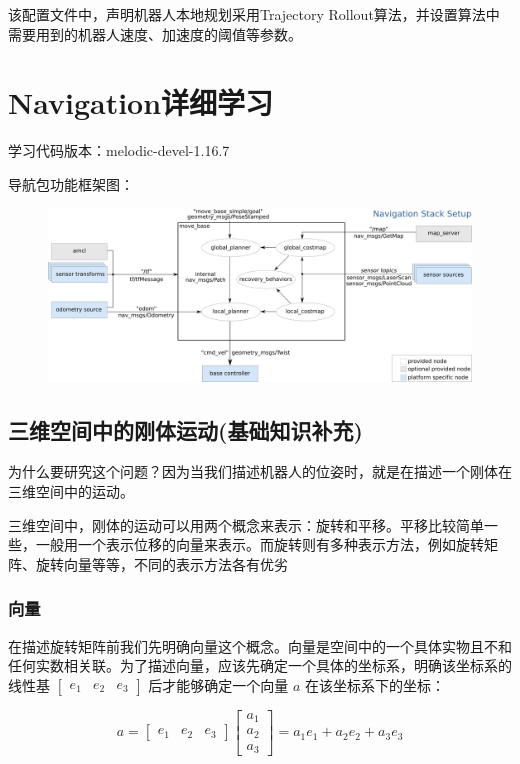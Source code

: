 \documentclass[9pt, oneside]{book}
\begin{document}
该配置文件中，声明机器人本地规划采用Trajectory Rollout算法，并设置算法中需要用到的机器人速度、加速度的阈值等参数。

\chapter{Navigation详细学习}

学习代码版本：melodic-devel-1.16.7

导航包功能框架图：

\begin{figure}[H]
    \centering
    \includegraphics[width=1.0\linewidth]{image/导航功能包框架.png}
\end{figure}

\section{三维空间中的刚体运动(基础知识补充)}

为什么要研究这个问题？因为当我们描述机器人的位姿时，就是在描述一个刚体在三维空间中的运动。

三维空间中，刚体的运动可以用两个概念来表示：旋转和平移。平移比较简单一些，一般用一个表示位移的向量来表示。而旋转则有多种表示方法，例如旋转矩阵、旋转向量等等，不同的表示方法各有优劣

\subsection{向量}

在描述旋转矩阵前我们先明确向量这个概念。向量是空间中的一个具体实物且不和任何实数相关联。为了描述向量，应该先确定一个具体的坐标系，明确该坐标系的线性基 $\begin{bmatrix} e_1 & e_2 & e_3 \end{bmatrix}$ 后才能够确定一个向量 $a$ 在该坐标系下的坐标：

\begin{equation}
    a = 
    \begin{bmatrix}
      e_1 & e_2 & e_3
    \end{bmatrix}
    \begin{bmatrix}
     a_1\\
     a_2\\
     a_3
    \end{bmatrix}
    = a_1e_1+a_2e_2+a_3e_3
\end{equation}
\end{document}
